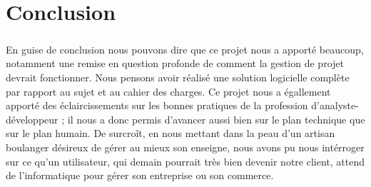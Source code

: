 \chapter*{Conclusion}
\paragraph{}
    En guise de conclusion nous pouvons dire que ce projet nous a apporté
    beaucoup, notamment une remise en question profonde de comment la gestion
    de projet devrait fonctionner. Nous pensons avoir réalisé une solution
    logicielle complète par rapport au sujet et au cahier des charges.
    Ce projet nous a égallement apporté des éclaircissements sur les bonnes
    pratiques de la profession d'analyste-développeur ; il nous a donc permis
    d'avancer aussi bien sur le plan technique que sur le plan humain.
    De surcroît, en nous mettant dans la peau d'un artisan boulanger désireux
    de gérer au mieux son enseigne, nous avons pu nous intérroger sur ce qu'un
    utilisateur, qui demain pourrait très bien devenir notre client, attend de
    l'informatique pour gérer son entreprise ou son commerce.